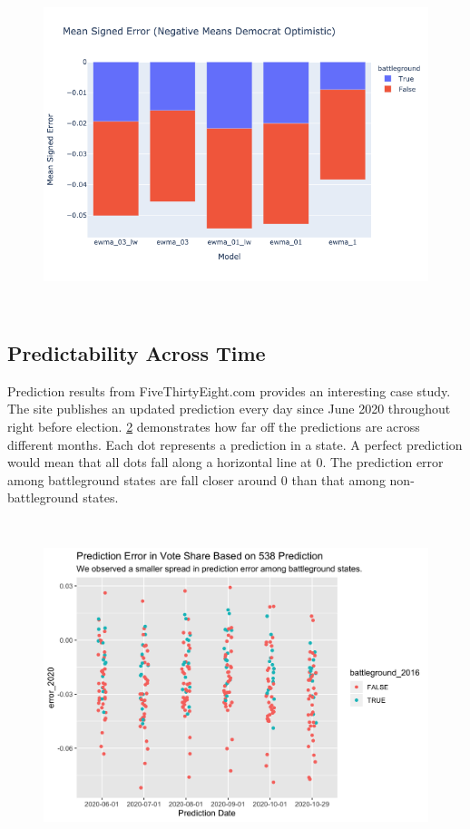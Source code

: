 \begin{figure}[H]
    \centering
    \includegraphics[height=26em]{figures/ewma_03_lw_ewma_03_ewma_01_lw_ewma_01_ewma_1_mean_signed_error.png}
    \caption{}
    \label{fig:ewma_03_lw_ewma_03_ewma_01_lw_ewma_01_ewma_1_mean_signed_error}
\end{figure}


\subsection{Predictability Across Time}

Prediction results from FiveThirtyEight.com provides an interesting case study. The site publishes an updated prediction every day since June 2020 throughout right before election. \ref{fig:SignedError_538} demonstrates how far off the predictions are across different months. Each dot represents a prediction in a state. A perfect prediction would mean that all dots fall along a horizontal line at 0. The prediction error among battleground states are fall closer around 0 than that among non-battleground states.

\begin{figure}[H]
    \centering
    \includegraphics[height=26em]{figures/SignedError_538.png}
    \caption{}
    \label{fig:SignedError_538}
\end{figure}

